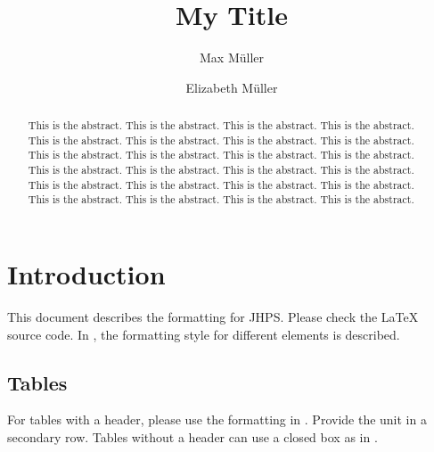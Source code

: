 \documentclass{jhps}
\begin{document}
\JHPSissue{} %

\title{My Title}
\author{
        Max Müller
        \and Elizabeth Müller
}


\maketitle

\begin{abstract}
This is the abstract. This is the abstract. This is the abstract. This is the abstract. This is the abstract. This is the abstract. This is the abstract. This is the abstract. This is the abstract. This is the abstract. This is the abstract. This is the abstract. This is the abstract. This is the abstract. This is the abstract. This is the abstract. This is the abstract. This is the abstract. This is the abstract. This is the abstract. This is the abstract. This is the abstract. This is the abstract. This is the abstract.
\end{abstract}

\section{Introduction}
\label{sec:intro}

This document describes the formatting for JHPS.
Please check the LaTeX source code. In , the formatting style for different elements is described.

\subsection{Tables}

For tables with a header, please use the formatting in .
Provide the unit in a secondary row.
Tables without a header can use a closed box as in .
\end{document}
